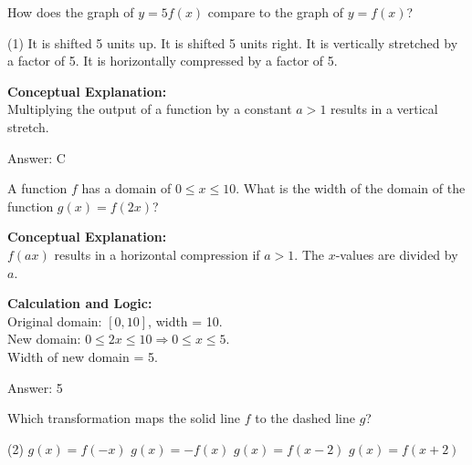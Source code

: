 \documentclass[11pt,paper=a4,answers]{exam}
\begin{document}
\begin{questions}
\question
How does the graph of $y = 5f(x)$ compare to the graph of $y = f(x)$?
\begin{tasks}(1)
    \task It is shifted 5 units up.
    \task It is shifted 5 units right.
    \task It is vertically stretched by a factor of 5.
    \task It is horizontally compressed by a factor of 5.
\end{tasks}

\begin{solution}
\textbf{Conceptual Explanation:} \\
Multiplying the output of a function by a constant $a > 1$ results in a vertical stretch.

\vspace{25pt}

Answer: \colorbox{yellow!100}{C}
\end{solution}

\vspace{40pt}

\question
A function $f$ has a domain of $0 \leq x \leq 10$. What is the width of the domain of the function $g(x) = f(2x)$?

\begin{solution}
\textbf{Conceptual Explanation:} \\
$f(ax)$ results in a horizontal compression if $a > 1$. The $x$-values are divided by $a$.

\vspace{20pt}

\textbf{Calculation and Logic:} \\
Original domain: $[0, 10]$, width = 10. \\
New domain: $0 \leq 2x \leq 10 \Rightarrow 0 \leq x \leq 5$. \\
Width of new domain = 5.

\vspace{25pt}

Answer: \colorbox{yellow!100}{5}
\end{solution}

\vspace{40pt}

\question
\begin{center}
\end{center}
Which transformation maps the solid line $f$ to the dashed line $g$?
\begin{tasks}(2)
    \task $g(x) = f(-x)$
    \task $g(x) = -f(x)$
    \task $g(x) = f(x-2)$
    \task $g(x) = f(x+2)$
\end{tasks}


\end{questions}
\end{document}
